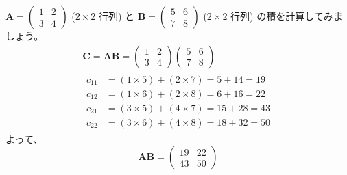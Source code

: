 \begin{ex}
$\bm{A} = \begin{pmatrix} 1 & 2 \\ 3 & 4 \end{pmatrix}$ ($2 \times 2$ 行列) と $\bm{B} = \begin{pmatrix} 5 & 6 \\ 7 & 8 \end{pmatrix}$ ($2 \times 2$ 行列) の積を計算してみましょう。
\begin{gather*}
\bm{C} = \bm{A}\bm{B} = \begin{pmatrix} 1 & 2 \\ 3 & 4 \end{pmatrix} \begin{pmatrix} 5 & 6 \\ 7 & 8 \end{pmatrix}\\
\begin{aligned}
c_{11} &= (1 \times 5) + (2 \times 7) = 5 + 14 = 19\\
c_{12} &= (1 \times 6) + (2 \times 8) = 6 + 16 = 22\\
c_{21} &= (3 \times 5) + (4 \times 7) = 15 + 28 = 43\\
c_{22} &= (3 \times 6) + (4 \times 8) = 18 + 32 = 50
\end{aligned}
\end{gather*}
よって、
\[\bm{A}\bm{B} = \begin{pmatrix} 19 & 22 \\ 43 & 50 \end{pmatrix}\]
\end{ex}

